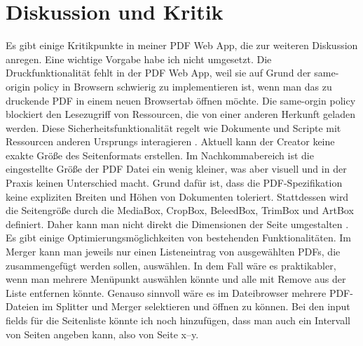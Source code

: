 \chapter{Diskussion und Kritik}
Es gibt einige Kritikpunkte in meiner PDF Web App, die zur weiteren Diskussion anregen. Eine wichtige Vorgabe habe ich nicht umgesetzt. Die Druckfunktionalität fehlt in der PDF Web App, weil sie auf Grund der same-origin policy in Browsern schwierig zu implementieren ist, wenn man das zu druckende PDF in einem neuen Browsertab öffnen möchte. Die same-orgin policy blockiert den Lesezugriff von Ressourcen, die von einer anderen Herkunft geladen werden. Diese Sicherheitsfunktionalität regelt wie Dokumente und Scripte mit Ressourcen anderen Ursprungs interagieren \cite{same-origin}. Aktuell kann der Creator keine exakte Größe des Seitenformats erstellen. Im Nachkommabereich ist die eingestellte Größe der PDF Datei ein wenig kleiner, was aber visuell und in der Praxis keinen Unterschied macht. Grund dafür ist, dass die PDF-Spezifikation keine expliziten Breiten und Höhen von Dokumenten toleriert. Stattdessen wird die Seitengröße durch die MediaBox, CropBox, BeleedBox, TrimBox und ArtBox definiert. Daher kann man nicht direkt die Dimensionen der Seite umgestalten \cite{pdf-lib-pagesize}. Es gibt einige Optimierungsmöglichkeiten von bestehenden Funktionalitäten. Im Merger kann man jeweils nur einen Listeneintrag von ausgewählten PDFs, die zusammengefügt werden sollen, auswählen. In dem Fall wäre es praktikabler, wenn man mehrere Menüpunkt auswählen könnte und alle mit Remove aus der Liste entfernen könnte. Genauso sinnvoll wäre es im Dateibrowser mehrere PDF-Dateien im Splitter und Merger selektieren und öffnen zu können. Bei den input fields für die Seitenliste könnte ich noch hinzufügen, dass man auch ein Intervall von Seiten angeben kann, also von Seite x–y. 
\par
